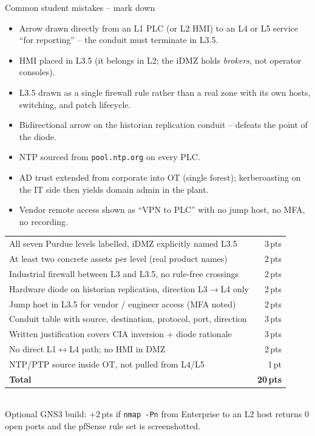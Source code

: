 \documentclass[11pt,a4paper]{article}
\begin{document}
\begin{solutionbox}{Common student mistakes -- mark down}
\begin{itemize}[leftmargin=1.2em, itemsep=1pt]
  \item Arrow drawn directly from an L1 PLC (or L2 HMI) to an L4 or L5 service ``for reporting'' -- the conduit must terminate in L3.5.
  \item HMI placed in L3.5 (it belongs in L2; the iDMZ holds \emph{brokers}, not operator consoles).
  \item L3.5 drawn as a single firewall rule rather than a real zone with its own hosts, switching, and patch lifecycle.
  \item Bidirectional arrow on the historian replication conduit -- defeats the point of the diode.
  \item NTP sourced from \texttt{pool.ntp.org} on every PLC.
  \item AD trust extended from corporate into OT (single forest); kerberoasting on the IT side then yields domain admin in the plant.
  \item Vendor remote access shown as ``VPN to PLC'' with no jump host, no MFA, no recording.
\end{itemize}
\end{solutionbox}

\begin{rubricbox}
\small
\begin{tabular}{@{}p{10.2cm}r@{}}
All seven Purdue levels labelled, iDMZ explicitly named L3.5            & 3\,pts\\
At least two concrete assets per level (real product names)             & 2\,pts\\
Industrial firewall between L3 and L3.5, no rule-free crossings         & 2\,pts\\
Hardware diode on historian replication, direction L3$\to$L4 only       & 2\,pts\\
Jump host in L3.5 for vendor / engineer access (MFA noted)              & 2\,pts\\
Conduit table with source, destination, protocol, port, direction       & 3\,pts\\
Written justification covers CIA inversion + diode rationale            & 3\,pts\\
No direct L1$\leftrightarrow$L4 path; no HMI in DMZ                     & 2\,pts\\
NTP/PTP source inside OT, not pulled from L4/L5                         & 1\,pt\\
\midrule
\textbf{Total}                                                          & \textbf{20\,pts}\\
\end{tabular}
\smallskip\\
Optional GNS3 build: $+2$\,pts if \texttt{nmap -Pn} from Enterprise to an L2 host returns 0 open ports and the pfSense rule set is screenshotted.
\end{rubricbox}
\end{document}
